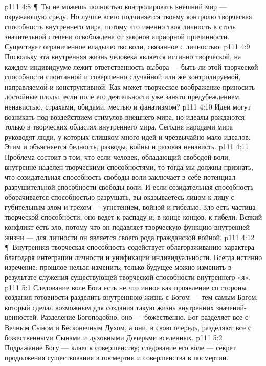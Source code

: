 \vs p111 4:8 \P\ Ты не можешь полностью контролировать внешний мир --- окружающую среду. Но лучше всего подчиняется твоему контролю творческая способность внутреннего мира, потому что именно твоя личность в столь значительной степени освобождена от законов априорной причинности. Существует ограниченное владычество воли, связанное с личностью.
\vs p111 4:9 Поскольку эта внутренняя жизнь человека является истинно творческой, на каждом индивидууме лежит ответственность выбора --- быть ли этой творческой способности спонтанной и совершенно случайной или же контролируемой, направляемой и конструктивной. Как может творческое воображение приносить достойные плоды, если поле его деятельности уже занято предубеждением, ненавистью, страхами, обидами, местью и фанатизмом?
\vs p111 4:10 Идеи могут возникать под воздействием стимулов внешнего мира, но идеалы рождаются только в творческих областях внутреннего мира. Сегодня народами мира руководят люди, у которых слишком много идей и чрезвычайно мало идеалов. Этим и объясняется бедность, разводы, войны и расовая ненависть.
\vs p111 4:11 Проблема состоит в том, что если человек, обладающий свободой воли, внутренне наделен творческими способностями, то тогда мы должны признать, что созидательная способность свободы воли заключает в себе потенциал разрушительной способности свободы воли. И если созидательная способность оборачивается способностью разрушать, вы оказываетесь лицом к лицу с губительным злом и грехом --- угнетением, войной и гибелью. Зло есть частица творческой способности, оно ведет к распаду и, в конце концов, к гибели. Всякий конфликт есть зло, потому что он подавляет творческую функцию внутренней жизни --- для личности он является своего рода гражданской войной.
\vs p111 4:12 \P\ Внутренняя творческая способность содействует облагораживанию характера благодаря интеграции личности и унификации индивидуальности. Всегда истинно изречение: прошлое нельзя изменить; только будущее можно изменить в результате служения существующей творческой способности внутреннего «я».
\vs p111 5:1 Следование воле Бога есть не что инное как проявление со стороны создания готовности разделить внутреннюю жизнь с Богом --- тем самым Богом, который сделал возможным для создания такую жизнь внутренних значений\hyp{}ценностей. Разделение Богоподобно, оно --- божественно. Бог разделяет все с Вечным Сыном и Бесконечным Духом, а они, в свою очередь, разделяют все с божественными Сынами и духовными Дочерьми вселенных.
\vs p111 5:2 Подражание Богу --- ключ к совершенству; следование его воле --- секрет продолжения существования в посмертии и совершенства в посмертии.
